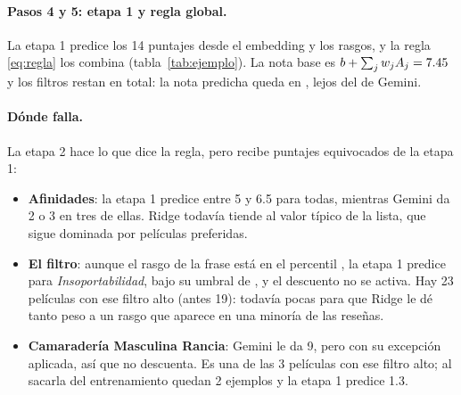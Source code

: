 \documentclass[11pt,a4paper]{article}
\begin{document}
\begin{table}[H]
  \centering\small
  
  \caption{Rasgos de frases de \emph{Insoportabilidad Prolongada} para Manhattan: fracción de sus chunks sobre el
  umbral de cada texto, la misma fracción en la película mediana y el percentil de Manhattan entre las \NPeliculasCV{}
  películas.}
  \label{tab:ejemplo_frases}
\end{table}

\paragraph{Pasos 4 y 5: etapa 1 y regla global.} La etapa 1 predice los 14 puntajes desde el embedding y los rasgos, y la
regla \eqref{eq:regla} los combina (tabla~\ref{tab:ejemplo}). La nota base es $b+\sum_j w_jA_j=7.45$ y los filtros
restan \EjDescuento{} en total: la nota predicha queda en \textbf{\EjNotaModelo}, lejos del \EjNotaGemini{} de Gemini.

\begin{table}[H]
  \centering\footnotesize
  
  \caption{Cálculo de la nota de Manhattan con el modelo entrenado sin ella. Para los filtros, ``act.'' es
  $\sigma(1.5(F_k-u_k))(1-E_k)$, la fracción del descuento $d_k$ que se aplica; ``exc.'' es la excepción.}
  \label{tab:ejemplo}
\end{table}

\paragraph{Dónde falla.} La etapa 2 hace lo que dice la regla, pero recibe puntajes equivocados de la etapa 1:
\begin{itemize}
  \item \textbf{Afinidades}: la etapa 1 predice entre 5 y 6.5 para todas, mientras Gemini da 2 o 3 en tres de ellas.
  Ridge todavía tiende al valor típico de la lista, que sigue dominada por películas preferidas.
  \item \textbf{El filtro}: aunque el rasgo de la frase está en el percentil \EjFrasePercentil, la etapa 1 predice
  \EjInsPredicho{} para \emph{Insoportabilidad}, bajo su umbral de \EjInsUmbral, y el descuento no se activa. Hay 23
  películas con ese filtro alto (antes 19): todavía pocas para que Ridge le dé tanto peso a un rasgo que aparece en una
  minoría de las reseñas.
  \item \textbf{Camaradería Masculina Rancia}: Gemini le da 9, pero con su excepción aplicada, así que no descuenta.
  Es una de las 3 películas con ese filtro alto; al sacarla del entrenamiento quedan 2 ejemplos y la etapa 1 predice 1.3.
\end{itemize}
\end{document}
